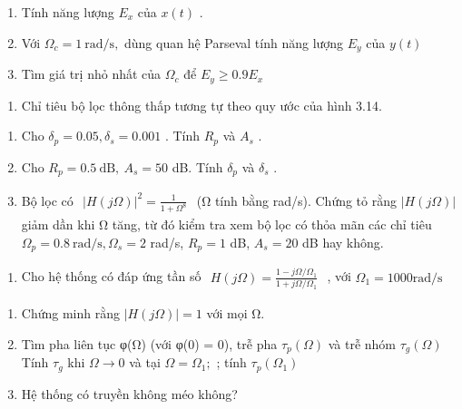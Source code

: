 \documentclass[
  10
]{article}
\providecommand{\tightlist}{%
  \setlength{\itemsep}{0pt}\setlength{\parskip}{0pt}}
\begin{document}
\begin{enumerate}
\def\labelenumi{(\alph{enumi})}
\item
  Tính năng lượng \(E _ { x }\) của \(x ( t )\) .
\item
  Với \(\Omega _ { c } = 1 \ \mathrm { r a d / s } ,\) dùng quan hệ
  Parseval tính năng lượng \(E _ { y }\) của \(y ( t )\)
\item
  Tìm giá trị nhỏ nhất của \(\Omega _ { c }\) để
  \(E _ { y } \ge 0 . 9 E _ { x }\)
\end{enumerate}

\begin{enumerate}
\def\labelenumi{\arabic{enumi}.}
\setcounter{enumi}{13}
\tightlist
\item
  Chỉ tiêu bộ lọc thông thấp tương tự theo quy ước của hình 3.14.
\end{enumerate}

\begin{enumerate}
\def\labelenumi{(\alph{enumi})}
\item
  Cho \(\delta _ { p } = 0 . 0 5 , \delta _ { s } = 0 . 0 0 1\) . Tính
  \(R _ { p }\) và \(A _ { s }\) .
\item
  Cho \(R _ { p } = 0 . 5 \ \mathrm { d B } , \ A _ { s } = 5 0\) dB.
  Tính \(\delta _ { p }\) và \(\delta _ { s }\) .
\item
  Bộ lọc có
  \(\begin{array} { r } { | H ( j \Omega ) | ^ { 2 } = \frac { 1 } { 1 + \Omega ^ { 8 } } } \end{array}\)
  (Ω tính bằng rad/s). Chứng tỏ rằng \(| H ( j \Omega ) |\) giảm dần khi
  Ω tăng, từ đó kiểm tra xem bộ lọc có thỏa mãn các chỉ tiêu
  \(\Omega _ { p } = 0 . 8 ~ \mathrm { r a d / s } , \Omega _ { s } = 2\)
  rad/s, \(R _ { p } = 1\) dB, \(A _ { s } = 2 0\) dB hay không.
\end{enumerate}

\begin{enumerate}
\def\labelenumi{\arabic{enumi}.}
\setcounter{enumi}{14}
\tightlist
\item
  Cho hệ thống có đáp ứng tần số
  \(\begin{array} { r } { H ( j \Omega ) = \frac { 1 - j \Omega / \Omega _ { 1 } } { 1 + j \Omega / \Omega _ { 1 } } } \end{array}\)
  , với \(\Omega _ { 1 } = 1 0 0 0 \mathrm { r a d / s }\)
\end{enumerate}

\begin{enumerate}
\def\labelenumi{(\alph{enumi})}
\item
  Chứng minh rằng \(| H ( j \Omega ) | = 1\) với mọi Ω.
\item
  Tìm pha liên tục φ(Ω) (với φ(0) = 0), trễ pha
  \(\tau _ { p } ( \Omega )\) và trễ nhóm \(\tau _ { g } ( \Omega )\)
  Tính \(\tau _ { g }\) khi \(\Omega \to 0\) và tại
  \(\Omega = \Omega _ { 1 } ;\) ; tính
  \(\tau _ { p } ( \Omega _ { 1 } )\)
\item
  Hệ thống có truyền không méo không?
\end{enumerate}
\end{document}
